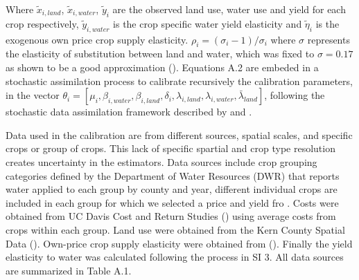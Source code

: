\documentclass[11pt,a4paper]{article}
\begin{document}
Where $\tilde{x}_{i,land}$, $\tilde{x}_{i,water}$, $\tilde{y}_{i}$ are the observed land use, water use and yield for each crop respectively, $\tilde{y}_{i,water}$ is the crop specific water yield elasticity and $\tilde{\eta}_i$ is the exogenous own price crop supply elasticity. $\rho_{i}=(\sigma_{i}-1)/\sigma_{i}$ where $\sigma$ represents the elasticity of substitution between land and water, which was fixed to $\sigma=0.17$ as shown to be a good approximation  (\cite{howitt_calibrating_2012}). Equations A.2 are embeded in a stochastic assimilation process to calibrate recursively the calibration parameters, in the vector $\theta_{i} = [\mu_{i},\beta_{i,water},\beta_{i,land},\delta_{i},\lambda_{i,land},\lambda_{i,water},\bar{\lambda}_{land}]$, following the stochastic data assimilation framework described by \textcite{maneta_stochastic_2014} and \textcite{maneta_satellite-driven_2020}. 

Data used in the calibration are from different sources, spatial scales, and specific crops or group of crops. This lack of specific spartial and crop type resolution creates uncertainty in the estimators. Data sources include crop grouping categories defined by the Department of Water Resources (DWR) that reports water applied to each group by county and year, different individual crops are included in each group for which we selected a price and yield fro \textcite{usda_national_2020}. Costs were obtained from UC Davis Cost and Return Studies (\cite{uc_davis_current_2015}) using average costs from crops within each group. Land use were obtained from the Kern County Spatial Data (\textcite{kcdams_kern_2020}). Own-price crop supply elasticity were obtained from (\cite{rodriguez-flores_global_2022}). Finally the yield elasticity to water was calculated following the process in SI 3. All data sources are summarized in Table A.1.
\end{document}
